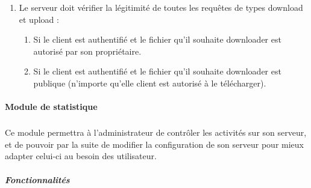 \documentclass[10pt,a4paper]{report}
\begin{document}
	\begin{enumerate}
		\item Le serveur doit vérifier la légitimité de toutes les requêtes de types download et upload :
		\begin{enumerate}
			\item Si le client est authentifié et le fichier qu'il souhaite downloader est autorisé par son propriétaire.
			\item Si le client est authentifié et le fichier qu'il souhaite downloader est publique (n'importe qu'elle client est autorisé à le télécharger).
		\end{enumerate}
	\end{enumerate}
	
\paragraph{Module de statistique}
	\subparagraph*{ }
	Ce module permettra à l'administrateur de contrôler les activités sur son serveur, et 	de pouvoir par la suite de modifier la configuration de son serveur pour mieux adapter celui-ci au besoin des utilisateur.

	\subparagraph{Fonctionnalités}
\end{document}
